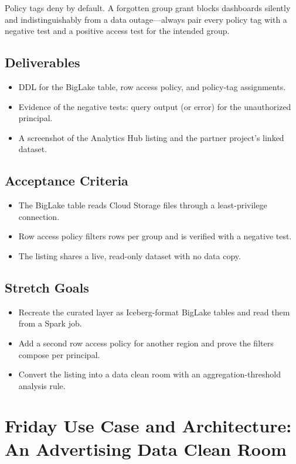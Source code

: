 \begin{notebox}
Policy tags deny by default. A forgotten group grant blocks dashboards silently and indistinguishably from a data outage---always pair every policy tag with a negative test and a positive access test for the intended group.
\end{notebox}

\subsection*{Deliverables}
\begin{itemize}
    \item DDL for the BigLake table, row access policy, and policy-tag assignments.
    \item Evidence of the negative tests: query output (or error) for the unauthorized principal.
    \item A screenshot of the Analytics Hub listing and the partner project's linked dataset.
\end{itemize}

\subsection*{Acceptance Criteria}
\begin{itemize}
    \item The BigLake table reads Cloud Storage files through a least-privilege connection.
    \item Row access policy filters rows per group and is verified with a negative test.
    \item The listing shares a live, read-only dataset with no data copy.
\end{itemize}

\subsection*{Stretch Goals}
\begin{itemize}
    \item Recreate the curated layer as Iceberg-format BigLake tables and read them from a Spark job.
    \item Add a second row access policy for another region and prove the filters compose per principal.
    \item Convert the listing into a data clean room with an aggregation-threshold analysis rule.
\end{itemize}

\section{Friday Use Case and Architecture: An Advertising Data Clean Room}


